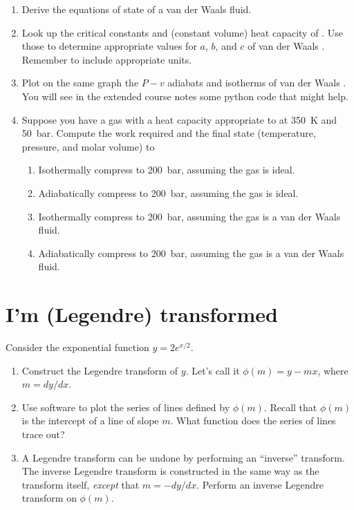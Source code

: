 \documentclass[11pt]{article}
\begin{document}
\begin{enumerate}
\item Derive the equations of state of a van der Waals fluid.

\item Look up the critical constants and (constant volume) heat capacity of .  Use those to determine appropriate values for \(a\), \(b\), and \(c\) of van der Waals .  Remember to include appropriate units.

\item Plot on the same graph the \(P-v\) adiabats and isotherms of van der Waals .  You will see in the extended course notes some python code that might help.

\item Suppose you have a gas with a heat capacity appropriate to  at \SI{350}{K} and \SI{50}{bar}. Compute the work required and the final state (temperature, pressure, and molar volume) to

\begin{enumerate}
\item Isothermally compress to \SI{200}{bar}, assuming the gas is ideal.

\item Adiabatically compress to \SI{200}{bar}, assuming the gas is ideal.

\item Isothermally compress to \SI{200}{bar}, assuming the gas is a van der Waals fluid.

\item Adiabatically compress to \SI{200}{bar}, assuming the gas is a van der Waals fluid.
\end{enumerate}
\end{enumerate}


\section{I'm (Legendre) transformed}
\label{sec:org77c8c6b}
Consider the exponential function \(y=2 e^{x/2}\).

\begin{enumerate}
\item Construct the Legendre transform of \(y\).  Let's call it \(\phi(m) = y - m x\), where \(m = dy/dx\).

\item Use software to plot the series of lines defined by \(\phi(m)\). Recall that \(\phi(m)\) is
the intercept of a line of slope \(m\).  What  function does the series of lines trace out?

\item A Legendre transform can be undone by performing an ``inverse'' transform.  The inverse
Legendre transform is constructed in the same way as the transform itself,
\emph{except} that \(m=-dy/dx\). Perform an inverse Legendre transform on \(\phi(m)\).
\end{enumerate}
\end{document}
